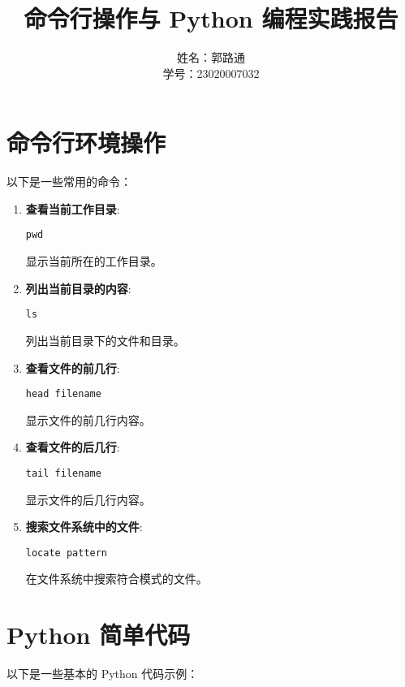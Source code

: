 \documentclass{ctexart}
\begin{document}
\title{命令行操作与 Python 编程实践报告}
\author{姓名：郭路通 \\ 学号：23020007032}
\date{}
\maketitle

\section{命令行环境操作}
以下是一些常用的命令：

\begin{enumerate}[label=\arabic*.]
\item \textbf{查看当前工作目录}:
\begin{lstlisting}
pwd
\end{lstlisting}
显示当前所在的工作目录。

\item \textbf{列出当前目录的内容}:
\begin{lstlisting}
ls
\end{lstlisting}
列出当前目录下的文件和目录。

\item \textbf{查看文件的前几行}:
\begin{lstlisting}
head filename
\end{lstlisting}
显示文件的前几行内容。

\item \textbf{查看文件的后几行}:
\begin{lstlisting}
tail filename
\end{lstlisting}
显示文件的后几行内容。

\item \textbf{搜索文件系统中的文件}:
\begin{lstlisting}
locate pattern
\end{lstlisting}
在文件系统中搜索符合模式的文件。
\end{enumerate}

\section{Python 简单代码}
以下是一些基本的 Python 代码示例：
\end{document}
